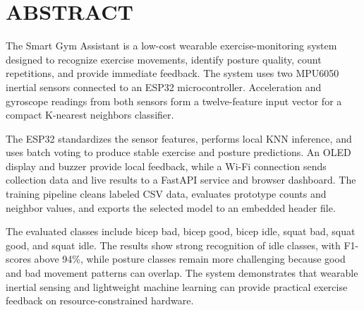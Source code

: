 \chapter*{ABSTRACT}

The Smart Gym Assistant is a low-cost wearable exercise-monitoring system designed
to recognize exercise movements, identify posture quality, count repetitions, and
provide immediate feedback. The system uses two MPU6050 inertial sensors connected
to an ESP32 microcontroller. Acceleration and gyroscope readings from both sensors
form a twelve-feature input vector for a compact K-nearest neighbors classifier.

The ESP32 standardizes the sensor features, performs local KNN inference, and uses
batch voting to produce stable exercise and posture predictions. An OLED display
and buzzer provide local feedback, while a Wi-Fi connection sends collection data
and live results to a FastAPI service and browser dashboard. The training pipeline
cleans labeled CSV data, evaluates prototype counts and neighbor values, and exports
the selected model to an embedded header file.

The evaluated classes include bicep bad, bicep good, bicep idle, squat bad, squat
good, and squat idle. The results show strong recognition of idle classes, with F1-
scores above 94\%, while posture classes remain more challenging because good and
bad movement patterns can overlap. The system demonstrates that wearable inertial
sensing and lightweight machine learning can provide practical exercise feedback on
resource-constrained hardware.
